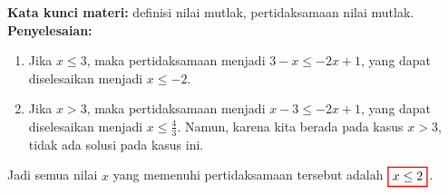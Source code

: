 \documentclass[10pt,openany,a4paper]{article}
\theoremstyle{definition}
\theoremstyle{definition}
\theoremstyle{plain}
\newenvironment{jawab}[2][tes]{
\textbf{Kata kunci materi:} #1.\\
\textbf{Penyelesaian:} #2
}{}
\begin{document}
\begin{enumerate}
\begin{jawab}[definisi nilai mutlak, pertidaksamaan nilai mutlak]
{\begin{enumerate}
                    \begin{enumerate}
                        \item Jika $x\leq 3$, maka pertidaksamaan menjadi $3-x\leq -2x+1$, yang dapat diselesaikan menjadi $x\leq -2$.
                        \item Jika $x>3$, maka pertidaksamaan menjadi $x-3\leq -2x+1$, yang dapat diselesaikan menjadi $x\leq \frac{4}{3}$. Namun, karena kita berada pada kasus $x>3$, tidak ada solusi pada kasus ini.
                    \end{enumerate}
                    Jadi semua nilai $x$ yang memenuhi pertidaksamaan tersebut adalah $\colorlet{oldcolor}{.}
        \color{red}
        \setlength{\fboxrule}{1pt} \boxed{\color{oldcolor}x \leq 2}\color{oldcolor}$.
                \end{enumerate}
            }
                

\end{jawab}
\end{enumerate}
\end{document}
